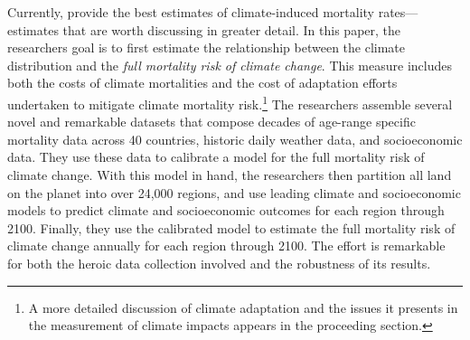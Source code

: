 Currently, \cite{carleton2022valuing} provide the best estimates of climate-induced mortality rates---estimates that are worth discussing in greater detail. In this paper, the researchers goal is to first estimate the relationship between the climate distribution and the \emph{full mortality risk of climate change}. This measure includes both the costs of climate mortalities and the cost of adaptation efforts undertaken to mitigate climate mortality risk.\footnote{A more detailed discussion of climate adaptation and the issues it presents in the measurement of climate impacts appears in the proceeding section.} The researchers assemble several novel and remarkable datasets that compose decades of age-range specific mortality data across 40 countries, historic daily weather data, and socioeconomic data. They use these data to calibrate a model for the full mortality risk of climate change. With this model in hand, the researchers then partition all land on the planet into over 24,000 regions, and use leading climate and socioeconomic models to predict climate and socioeconomic outcomes for each region through 2100. Finally, they use the calibrated model to estimate the full mortality risk of climate change annually for each region through 2100. The effort is remarkable for both the heroic data collection involved and the robustness of its results. 


